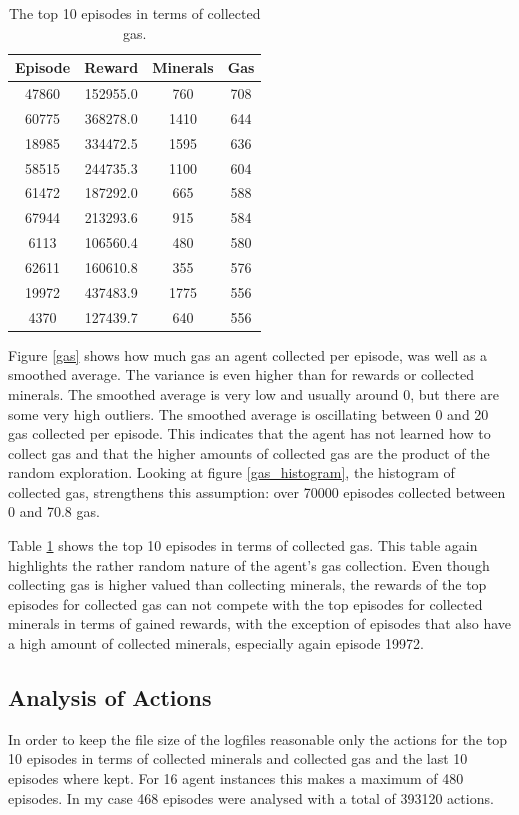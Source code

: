 \documentclass{article}
\begin{document}
\begin{table}
\begin{tabular}{|c|c|c|c|}
\hline
Episode & Reward & Minerals & Gas\\
\hline
47860 & 152955.0 & 760 & 708 \\
60775 & 368278.0 & 1410 & 644 \\
18985 & 334472.5 & 1595 & 636 \\
58515 & 244735.3 & 1100 & 604 \\
61472 & 187292.0 & 665 & 588 \\
67944 & 213293.6 & 915 & 584 \\
6113 & 106560.4 & 480 & 580 \\
62611 & 160610.8 & 355 & 576 \\
19972 & 437483.9 & 1775 & 556 \\
4370 & 127439.7 & 640 & 556 \\
\hline
\end{tabular}
\caption{The top 10 episodes in terms of collected gas.}
\label{gas_table}
\end{table}

Figure \ref{gas} shows how much gas an agent collected per episode, was well as 
a smoothed average. The variance is even higher than for rewards or collected 
minerals. The smoothed average is very low and usually around 0, but there are 
some very high outliers. The smoothed average is oscillating between 0 and 20 
gas collected per episode. This indicates that the agent has not learned how to 
collect gas and that the higher amounts of collected gas are the product of the 
random exploration. Looking at figure \ref{gas_histogram}, the histogram of 
collected gas, strengthens this assumption: over 70000 episodes collected 
between 0 and 70.8 gas. 

Table \ref{gas_table} shows the top 10 episodes in terms of collected gas. This 
table again highlights the rather random nature of the agent's gas collection. 
Even though collecting gas is higher valued than collecting minerals, the 
rewards of the top episodes for collected gas can not compete with the top 
episodes for collected minerals in terms of gained rewards, with the exception 
of episodes that also have a high amount of collected minerals, especially 
again episode 19972.

\subsection{Analysis of Actions}
In order to keep the file size of the logfiles reasonable only the actions for 
the top 10 episodes in terms of collected minerals and collected gas and the 
last 10 episodes where kept. For 16 agent instances this makes a maximum of 480 
episodes. In my case 468 episodes were analysed with a total of 393120 actions. 
\end{document}
